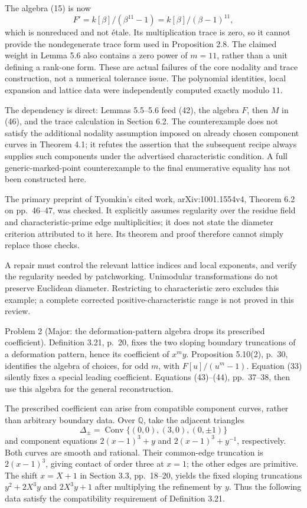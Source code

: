 \documentclass[10pt]{article}
\begin{document}
The algebra (15) is now \[F'=k[\beta]/(\beta^{11}-1)
    =k[\beta]/(\beta-1)^{11},\] which is nonreduced and not étale. Its multiplication trace is zero, so it cannot provide the nondegenerate trace form used in Proposition 2.8. The claimed weight in Lemma 5.6 also contains a zero power of \(m=11\), rather than a unit defining a rank-one form. These are actual failures of the core nodality and trace construction, not a numerical tolerance issue. The polynomial identities, local expansion and lattice data were independently computed exactly modulo \(11\).\par
The dependency is direct: Lemmas 5.5–5.6 feed (42), the algebra \(F\), then \(M\) in (46), and the trace calculation in Section 6.2. The counterexample does not satisfy the additional nodality assumption imposed on already chosen component curves in Theorem 4.1; it refutes the assertion that the subsequent recipe always supplies such components under the advertised characteristic condition. A full generic-marked-point counterexample to the final enumerative equality has not been constructed here.\par
The primary preprint of Tyomkin’s cited work, arXiv:1001.1554v4, Theorem 6.2 on pp. 46–47, was checked. It explicitly assumes regularity over the residue field and characteristic-prime edge multiplicities; it does not state the diameter criterion attributed to it here. Its theorem and proof therefore cannot simply replace those checks.\par
A repair must control the relevant lattice indices and local exponents, and verify the regularity needed by patchworking. Unimodular transformations do not preserve Euclidean diameter. Restricting to characteristic zero excludes this example; a complete corrected positive-characteristic range is not proved in this review.\par
Problem 2 (Major: the deformation-pattern algebra drops its prescribed coefficient).  Definition 3.21, p. 20, fixes the two sloping boundary truncations of a deformation pattern, hence its coefficient of \(x^my\). Proposition 5.10(2), p. 30, identifies the algebra of choices, for odd \(m\), with \(F[u]/(u^m-1)\). Equation (33) silently fixes a special leading coefficient. Equations (43)–(44), pp. 37–38, then use this algebra for the general reconstruction.\par
The prescribed coefficient can arise from compatible component curves, rather than arbitrary boundary data. Over \(\mathbb Q\), take the adjacent triangles \[\Delta_\pm=\operatorname{Conv}\{(0,0),(3,0),(0,\pm1)\}\] and component equations \(2(x-1)^3+y\) and \(2(x-1)^3+y^{-1}\), respectively. Both curves are smooth and rational. Their common-edge truncation is \(2(x-1)^3\), giving contact of order three at \(x=1\); the other edges are primitive. The shift \(x=X+1\) in Section 3.3, pp. 18–20, yields the fixed sloping truncations \(y^2+2X^3y\) and \(2X^3y+1\) after multiplying the refinement by \(y\). Thus the following data satisfy the compatibility requirement of Definition 3.21.\par
\end{document}
